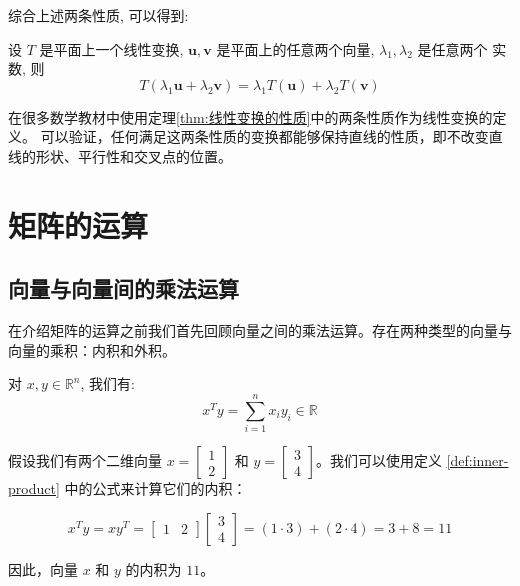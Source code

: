综合上述两条性质, 可以得到:

设 $T$ 是平面上一个线性变换, $\boldsymbol{u}, \boldsymbol{v}$ 是平面上的任意两个向量, $\lambda_1, \lambda_2$ 是任意两个 实数, 则
\begin{equation}
  T\left(\lambda_1 \boldsymbol{u}+\lambda_2 \boldsymbol{v}\right)=\lambda_1 T (\boldsymbol{u})+\lambda_2 T (\boldsymbol{v})
\end{equation}

\begin{note}
  在很多数学教材中使用定理\ref{thm:线性变换的性质}中的两条性质作为线性变换的定义。
  可以验证，任何满足这两条性质的变换都能够保持直线的性质，即不改变直线的形状、平行性和交叉点的位置。
\end{note}

\section{矩阵的运算}

\subsection{向量与向量间的乘法运算}

在介绍矩阵的运算之前我们首先回顾向量之间的乘法运算。存在两种类型的向量与向量的乘积：内积和外积。

\begin{definition}[内积] \label{def:inner-product} 
对 $x, y \in \mathbb{R}^n$, 我们有:
$$
x^T y=\sum_{i=1}^n x_i y_i \in \mathbb{R}
$$
\end{definition}

\begin{exercise}\label{exer:01}
假设我们有两个二维向量 $x = \begin{bmatrix} 1 \\ 2 \end{bmatrix}$ 和 $y = \begin{bmatrix} 3 \\ 4 \end{bmatrix}$。我们可以使用定义 \ref{def:inner-product} 中的公式来计算它们的内积：

\[
x^T y = x y^T = \begin{bmatrix} 1 & 2 \end{bmatrix} \begin{bmatrix} 3 \\ 4 \end{bmatrix} = (1 \cdot 3) + (2 \cdot 4) = 3 + 8 = 11
\]

因此，向量 $x$ 和 $y$ 的内积为 $11$。
\end{exercise}

